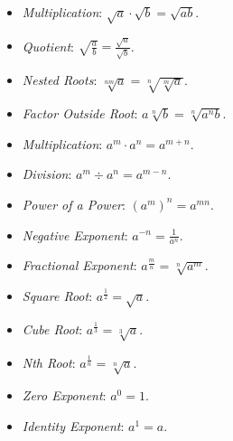 \begin{itemize}

    \item \emph{Multiplication}: \(\sqrt{a} \cdot \sqrt{b} = \sqrt{ab}\).

    \item \emph{Quotient}: \(\sqrt{\frac{a}{b}} = \frac{\sqrt{a}}{\sqrt{b}}\).

    \item \emph{Nested Roots}: \(\sqrt[nm]{a} = \sqrt[n]{\sqrt[m]{a}}\).

    \item \emph{Factor Outside Root}: \(a\sqrt[n]{b} = \sqrt[n]{a^n b}\).

    \item \emph{Multiplication}: \(a^m \cdot a^n = a^{m+n}\).

    \item \emph{Division}: \(a^m \div a^n = a^{m-n}\).

    \item \emph{Power of a Power}: \({(a^m)}^n = a^{mn}\).

    \item \emph{Negative Exponent}: \(a^{-n} = \frac{1}{a^n}\).

    \item \emph{Fractional Exponent}: \(a^{\frac{m}{n}} = \sqrt[n]{a^m}\).

    \item \emph{Square Root}: \(a^{\frac{1}{2}} = \sqrt{a}\).

    \item \emph{Cube Root}: \(a^{\frac{1}{3}} = \sqrt[3]{a}\).

    \item \emph{Nth Root}: \(a^{\frac{1}{n}} = \sqrt[n]{a}\).

    \item \emph{Zero Exponent}: \(a^0 = 1\).

    \item \emph{Identity Exponent}: \(a^1 = a\).

\end{itemize}


